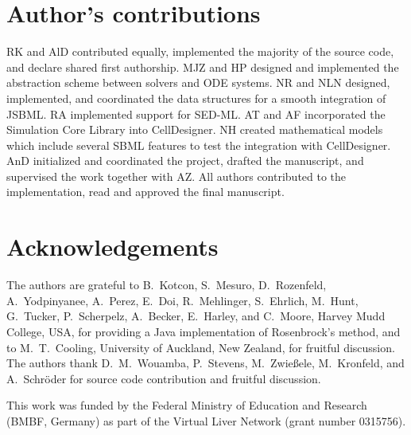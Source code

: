 \documentclass[10pt]{bmc_article}
\newenvironment{bmcformat}{\begin{raggedright}\baselineskip20pt\sloppy\setboolean{publ}{false}}{\end{raggedright}\baselineskip20pt\sloppy}
\begin{document}
\begin{bmcformat}
\section*{Author's contributions}
RK and AlD contributed equally, implemented the majority of the source code, and
declare shared first authorship.
MJZ and HP designed and implemented the abstraction scheme between solvers and
\acs{ODE} systems.
NR and NLN designed, implemented, and coordinated the data structures for a
smooth integration of JSBML.
RA implemented support for \acs{SED-ML}.
AT and AF incorporated the Simulation Core Library into CellDesigner.
NH created mathematical models which include several SBML features to
test the integration with CellDesigner.
AnD initialized and coordinated the project, drafted the manuscript, and
supervised the work together with AZ.
All authors contributed to the implementation, read and approved the final
manuscript.    

\section*{Acknowledgements}
The authors are grateful to B.~Kotcon, S.~Mesuro, D.~Rozenfeld, A.~Yodpinyanee,
A.~Perez, E.~Doi, R.~Mehlinger, S.~Ehrlich, M.~Hunt, G.~Tucker, P.~Scherpelz,
A.~Becker, E.~Harley, and C.~Moore, Harvey Mudd College, USA, for providing a
Java implementation of Rosenbrock's method, and to M.~T.~Cooling,
University of Auckland, New Zealand, for fruitful discussion. The authors thank
D.~M.~Wouamba, P.~Stevens, M.~Zwie\ss{}ele, M.~Kronfeld, and A.~Schr\"oder for
source code contribution and fruitful discussion.

This work was funded by the Federal Ministry of Education and Research (BMBF,
Germany) as part of the Virtual Liver Network (grant number 0315756).


\end{bmcformat}
\end{document}
